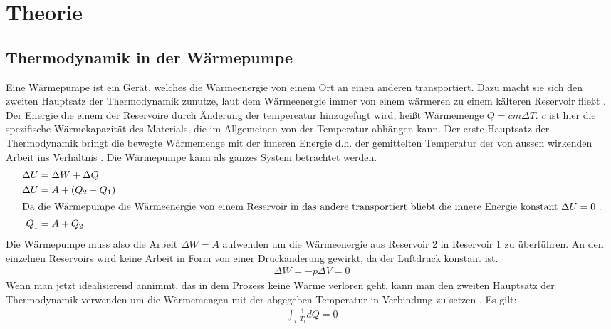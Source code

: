 \section{Theorie}

\subsection{Thermodynamik in der Wärmepumpe}
Eine Wärmepumpe ist ein Gerät, welches die Wärmeenergie von einem Ort an einen anderen transportiert.
Dazu macht sie sich den zweiten Hauptsatz der Thermodynamik zunutze, laut dem Wärmeenergie immer von einem 
wärmeren zu einem kälteren Reservoir fließt \cite[vgl][S. 321]{demtroeder}. 
Der Energie die einem der Reservoire durch Änderung der tempereatur hinzugefügt wird,
heißt Wärmemenge $ Q = c m \Delta T $. 
$ c $ ist hier die spezifische Wärmekapazität des Materials, die im Allgemeinen von der Temperatur abhängen kann.
Der erste Hauptsatz der Thermodynamik bringt die bewegte Wärmemenge mit der inneren Energie d.h. der gemittelten Temperatur
der von aussen wirkenden Arbeit ins Verhältnis \cite[vgl][S. 318]{demtroeder}. 
Die Wärmepumpe kann als ganzes System betrachtet werden. %
\begin{align}
                \Delta U &= \Delta W + \Delta Q \\
    \nonumber   \Delta U &= A + (Q_{2} - Q_{1}) \\
    \intertext{Da die Wärmepumpe die Wärmeenergie von einem Reservoir in das andere transportiert
    bliebt die innere Energie konstant $ \Delta U = 0 $ .} 
                Q_{1}    &= A + Q_{2} %
\end{align}
%
Die Wärmepumpe muss also die Arbeit $\Delta W = A$ aufwenden um die Wärmeenergie aus Reservoir 2 in Reservoir 1 zu überführen.
An den einzelnen Reservoirs wird keine Arbeit in Form von einer Druckänderung gewirkt, da der Luftdruck konstant ist.
\begin{align}
    \Delta W = - p \Delta V = 0 
\end{align}
Wenn man jetzt idealisierend annimmt, das in dem Prozess keine Wärme verloren geht, kann man den zweiten Hauptsatz der Thermodynamik
verwenden um die Wärmemengen mit der abgegeben Temperatur in Verbindung zu setzen \cite[vgl.][S.1]{man:v206}. 
Es gilt:
\begin{align}
    \int_{i} \frac{1}{T_{i}} dQ = 0 %
\end{align}

